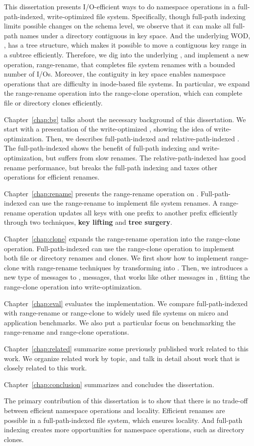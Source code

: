 This dissertation presents I/O-efficient ways to do namespace operations in a
full-path-indexed, write-optimized file system.
Specifically, though full-path indexing limits possible changes on the schema
level, we observe that it can make all full-path names under a directory
contiguous in key space.
And the underlying WOD, \bets, has a tree structure, which makes it possible to
move a contiguous key range in a subtree efficiently.
Therefore, we dig into the underlying \bets, and implement a new operation,
range-rename, that completes file system renames with a bounded number of I/Os.
Moreover, the contiguity in key space enables namespace operations that are
difficulty in inode-based file systems.
In particular, we expand the range-rename operation into the range-clone
operation, which can complete file or directory clones efficiently.

Chapter~\ref{chap:bg} talks about the necessary background of this dissertation.
We start with a presentation of the write-optimized \bets,
showing the idea of write-optimization.
Then, we describes full-path-indexed \betrfs and relative-path-indexed \betrfs.
The full-path-indexed \betrfs shows the benefit of full-path indexing and
write-optimization, but suffers from slow renames.
The relative-path-indexed \betrfs has good rename performance, but breaks the
full-path indexing and taxes other operations for efficient renames.

Chapter~\ref{chap:rename} presents the range-rename operation on \bets.
Full-path-indexed \betrfs can use the range-rename to implement file system
renames.
A range-rename operation updates all keys with one prefix to another prefix
efficiently through two techniques,
\textbf{key lifting} and \textbf{tree surgery}.

Chapter~\ref{chap:clone} expands the range-rename operation into the
range-clone operation.
Full-path-indexed \betrfs can use the range-clone operation to implement both
file or directory renames and clones.
We first show how to implement range-clone with range-rename techniques by
transforming \bets into \bedags.
Then, we introduces a new type of messages to \bedags, \goto messages,
that works like other messages in \bedags,
fitting the range-clone operation into write-optimization.

Chapter~\ref{chap:eval} evaluates the implementation.
We compare full-path-indexed \betrfs with range-rename or range-clone to
widely used file systems on micro and application benchmarks.
We also put a particular focus on benchmarking the range-rename and range-clone
operations.

Chapter~\ref{chap:related} summarize some previously published work related to
this work.
We organize related work by topic, and talk in detail about work that is closely
related to this work.

Chapter~\ref{chap:conclusion} summarizes and concludes the dissertation.

The primary contribution of this dissertation is to show that there is no
trade-off between efficient namespace operations and locality.
Efficient renames are possible in a full-path-indexed file system, which ensures
locality.
And full-path indexing creates more opportunities for namespace operations,
such as directory clones.

